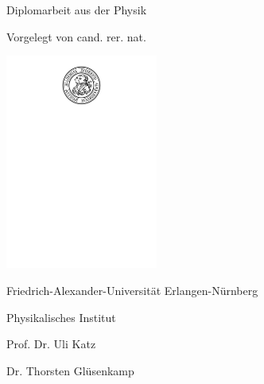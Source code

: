 

%
%
%

\makeatletter
\begin{titlepage}
  \begin{center}
  \begin{otherlanguage}{ngerman}

    \LARGE \@title

    \vspace{1cm}

    \large

    Diplomarbeit aus der Physik \medskip

    Vorgelegt von cand. rer. nat. \\ \@author \medskip

    \@date

    \vspace{1cm}
    \includegraphics[width=5cm, decodearray={0.2 0.5}]{img/fau-siegel-schwarz}
    \vspace{1cm}

    Friedrich-Alexander-Universität Erlangen-Nürnberg \medskip

    Physikalisches Institut \medskip

    Prof. Dr. Uli Katz \medskip

    Dr. Thorsten Glüsenkamp



  \end{otherlanguage}
  \end{center}
\end{titlepage}
\makeatother


\cleardoublepage
\clearpage\null\thispagestyle{empty}\newpage
\clearpage\null\thispagestyle{empty}\newpage
